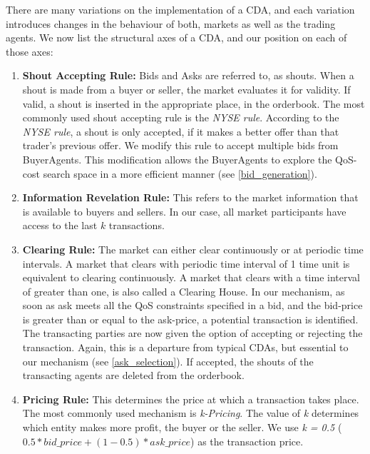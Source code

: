 \documentclass[10pt,journal,compsoc]{IEEEtran}
\begin{document}
There are many variations on the implementation of a CDA, and each variation introduces changes in the behaviour of both, markets as well as the trading agents. We now list the structural axes of a CDA, and our position on each of those axes:
\begin{enumerate}
	\item \textbf{Shout Accepting Rule:} Bids and Asks are referred to, as shouts. When a shout is made from a buyer or seller, the market evaluates it for validity. If valid, a shout is inserted in the appropriate place, in the orderbook. The most commonly used shout accepting rule is the \textit{NYSE rule}. According to the \textit{NYSE rule}, a shout is only accepted, if it makes a better offer than that trader's previous offer\cite{Vytelingum2006Structure}. We modify this rule to accept multiple bids from BuyerAgents. This modification allows the BuyerAgents to explore the QoS-cost search space in a more efficient manner (see \ref{bid_generation}). 

	\item \textbf{Information Revelation Rule:} This refers to the market information that is available to buyers and sellers. In our case, all market participants have access to the last $k$ transactions.	
	
	\item \textbf{Clearing Rule:} The market can either clear continuously or at periodic time intervals. A market that clears with periodic time interval of 1 time unit is equivalent to clearing continuously. A market that clears with a time interval of greater than one, is also called a Clearing House. In our mechanism, as soon as ask meets all the QoS constraints specified in a bid, and the bid-price is greater than or equal to the ask-price, a potential transaction is identified. The transacting parties are now given the option of accepting or rejecting the transaction. Again, this is a departure from typical CDAs, but essential to our mechanism (see \ref{ask_selection}). If accepted, the shouts of the transacting agents are deleted from the orderbook.
	
	\item \textbf{Pricing Rule:} This determines the price at which a transaction takes place. The most commonly used mechanism is \textit{k-Pricing}. The value of \textit{k} determines which entity makes more profit, the buyer or the seller. We use \textit{k = 0.5} ($0.5 * bid\_price + (1 - 0.5) * ask\_price$) as the transaction price. 	
	
\end{enumerate}
\end{document}
